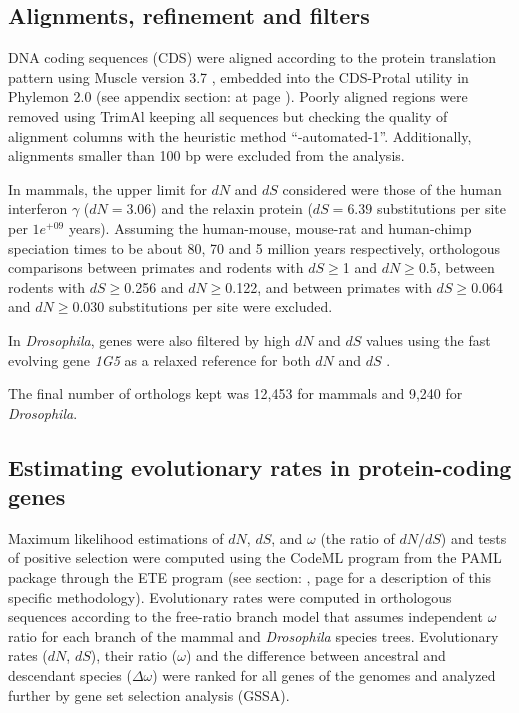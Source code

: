 \subsection{Alignments, refinement and filters}
\label{sec:alignm-refin-filt}

DNA coding sequences (CDS) were aligned according to the protein translation pattern using Muscle version 3.7 \cite{Edgar2004}, embedded into the CDS-Protal utility in Phylemon 2.0 \cite{Sanchez2011} (see appendix section: \textbf{} at page \pageref{sec:alignment}). Poorly aligned regions were removed using TrimAl \cite{Capella-Gutierrez2009} keeping all sequences but checking the quality of alignment columns with the heuristic method ``-automated-1''. Additionally, alignments smaller than 100 bp were excluded from the analysis.

In mammals, the upper limit for $dN$ and $dS$ considered were those of the human interferon $\gamma$ ($dN = 3.06$) and the relaxin protein \cite{Graur2000} ($dS = 6.39$ substitutions per site per $1e^{+09}$ years). Assuming the human-mouse, mouse-rat and human-chimp speciation times to be about 80, 70 and 5 million years \cite{BlairHedges2003} respectively, orthologous comparisons between primates and rodents with $dS\ge$1 and $dN\ge$0.5, between rodents with $dS\ge$0.256 and  $dN\ge$0.122, and between primates with $dS\ge$0.064 and $dN\ge$0.030 substitutions per site were excluded.

In \textit{Drosophila}, genes were also filtered by high $dN$ and $dS$ values using the fast evolving gene \textit{1G5} as a relaxed reference for both $dN$ and $dS$ \cite{Schmid1997}.

The final number of orthologs kept was 12,453 for mammals and 9,240 for \textit{Drosophila}.

\subsection{Estimating evolutionary rates in protein-coding genes}
\label{sec:evol-analys}

Maximum likelihood estimations of $dN$, $dS$, and $\omega$ (the ratio of $dN/dS$) and tests of positive selection were computed using the CodeML program from the PAML package \cite{Yang2007} through the ETE program \cite{Huerta-Cepas2010} (see section:  \textbf{}, page \pageref{sec:etes-evol-extension} for a description of this specific methodology). Evolutionary rates were computed in orthologous sequences according to the free-ratio branch model that assumes independent $\omega$ ratio for each branch of the mammal and \textit{Drosophila} species trees. Evolutionary rates ($dN$, $dS$), their ratio ($\omega$) and the difference between ancestral and descendant species ($\Delta\omega$) were ranked for all genes of the genomes and analyzed further by gene set selection analysis (GSSA).

